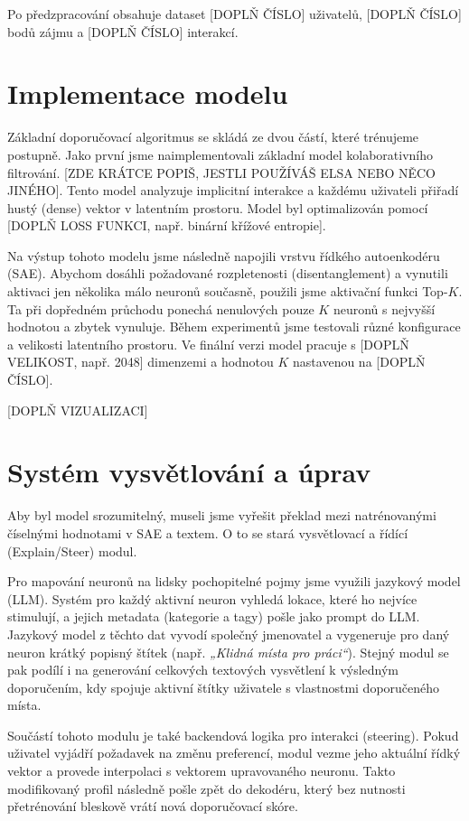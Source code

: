 Po předzpracování obsahuje dataset [DOPLŇ ČÍSLO] uživatelů, [DOPLŇ ČÍSLO] bodů zájmu a [DOPLŇ ČÍSLO] interakcí.

\section{Implementace modelu}
\label{sec:model}

Základní doporučovací algoritmus se skládá ze dvou částí, které trénujeme postupně. Jako první jsme naimplementovali základní model kolaborativního filtrování. [ZDE KRÁTCE POPIŠ, JESTLI POUŽÍVÁŠ ELSA NEBO NĚCO JINÉHO]. Tento model analyzuje implicitní interakce a každému uživateli přiřadí hustý (dense) vektor v latentním prostoru. Model byl optimalizován pomocí [DOPLŇ LOSS FUNKCI, např. binární křížové entropie].

Na výstup tohoto modelu jsme následně napojili vrstvu řídkého autoenkodéru (SAE). Abychom dosáhli požadované rozpletenosti (disentanglement) a vynutili aktivaci jen několika málo neuronů současně, použili jsme aktivační funkci Top-$K$. Ta při dopředném průchodu ponechá nenulových pouze $K$ neuronů s nejvyšší hodnotou a zbytek vynuluje. Během experimentů jsme testovali různé konfigurace a velikosti latentního prostoru. Ve finální verzi model pracuje s [DOPLŇ VELIKOST, např. 2048] dimenzemi a hodnotou $K$ nastavenou na [DOPLŇ ČÍSLO].

[DOPLŇ VIZUALIZACI]

\section{Systém vysvětlování a úprav}
\label{sec:explain_steer}

Aby byl model srozumitelný, museli jsme vyřešit překlad mezi natrénovanými číselnými hodnotami v SAE a textem. O to se stará vysvětlovací a řídící (Explain/Steer) modul.

Pro mapování neuronů na lidsky pochopitelné pojmy jsme využili jazykový model (LLM). Systém pro každý aktivní neuron vyhledá lokace, které ho nejvíce stimulují, a jejich metadata (kategorie a tagy) pošle jako prompt do LLM. Jazykový model z těchto dat vyvodí společný jmenovatel a vygeneruje pro daný neuron krátký popisný štítek (např. \textit{„Klidná místa pro práci“}). Stejný modul se pak podílí i na generování celkových textových vysvětlení k výsledným doporučením, kdy spojuje aktivní štítky uživatele s vlastnostmi doporučeného místa.

Součástí tohoto modulu je také backendová logika pro interakci (steering). Pokud uživatel vyjádří požadavek na změnu preferencí, modul vezme jeho aktuální řídký vektor a provede interpolaci s vektorem upravovaného neuronu. Takto modifikovaný profil následně pošle zpět do dekodéru, který bez nutnosti přetrénování bleskově vrátí nová doporučovací skóre.

